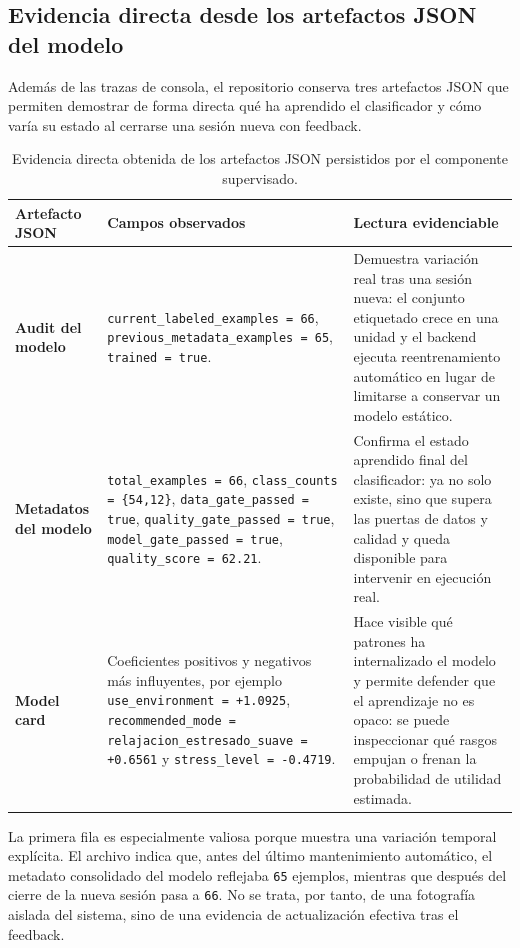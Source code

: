 \subsection*{Evidencia directa desde los artefactos JSON del modelo}

Además de las trazas de consola, el repositorio conserva tres artefactos JSON
que permiten demostrar de forma directa qué ha aprendido el clasificador y cómo
varía su estado al cerrarse una sesión nueva con feedback.

\begin{table}[H]
\centering
\small
\renewcommand{\arraystretch}{1.1}
\begin{tabularx}{\textwidth}{|P{2.7cm}|P{5.2cm}|Y|}
\hline
\textbf{Artefacto JSON} & \textbf{Campos observados} & \textbf{Lectura evidenciable} \\
\hline
\textbf{Audit del modelo} & \texttt{current\_labeled\_examples = 66}, \texttt{previous\_metadata\_examples = 65}, \texttt{trained = true}. & Demuestra variación real tras una sesión nueva: el conjunto etiquetado crece en una unidad y el backend ejecuta reentrenamiento automático en lugar de limitarse a conservar un modelo estático. \\
\hline
\textbf{Metadatos del modelo} & \texttt{total\_examples = 66}, \texttt{class\_counts = \{54,12\}}, \texttt{data\_gate\_passed = true}, \texttt{quality\_gate\_passed = true}, \texttt{model\_gate\_passed = true}, \texttt{quality\_score = 62.21}. & Confirma el estado aprendido final del clasificador: ya no solo existe, sino que supera las puertas de datos y calidad y queda disponible para intervenir en ejecución real. \\
\hline
\textbf{Model card} & Coeficientes positivos y negativos más influyentes, por ejemplo \texttt{use\_environment = +1.0925}, \texttt{recommended\_mode = relajacion\_estresado\_suave = +0.6561} y \texttt{stress\_level = -0.4719}. & Hace visible qué patrones ha internalizado el modelo y permite defender que el aprendizaje no es opaco: se puede inspeccionar qué rasgos empujan o frenan la probabilidad de utilidad estimada. \\
\hline
\end{tabularx}
\caption{Evidencia directa obtenida de los artefactos JSON persistidos por el componente supervisado.}
\label{tab:evidencia_json_modelo}
\end{table}

La primera fila es especialmente valiosa porque muestra una variación temporal
explícita. El archivo \texttt{}
indica que, antes del último mantenimiento automático, el metadato consolidado
del modelo reflejaba \texttt{65} ejemplos, mientras que después del cierre de
la nueva sesión pasa a \texttt{66}. No se trata, por tanto, de una fotografía
aislada del sistema, sino de una evidencia de actualización efectiva tras el
feedback.


